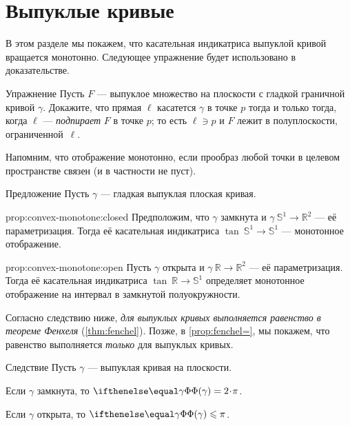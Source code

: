\section{Выпуклые кривые}

В этом разделе мы покажем, что касательная индикатриса выпуклой кривой вращается монотонно.
Следующее упражнение будет использовано в доказательстве.

\begin{thm}{Упражнение}\label{ex:tangent-support}
Пусть $F$ --- выпуклое множество на плоскости с гладкой граничной кривой $\gamma$.
Докажите, что прямая $\ell$ касатется $\gamma$ в точке $p$ тогда и только тогда, когда $\ell$ --- \emph{подпирает} $F$ в точке $p$;
то есть $\ell\ni p$ и $F$ лежит в полуплоскости, ограниченной~$\ell$.
\end{thm}

Напомним, что отображение монотонно, если прообраз любой точки в целевом пространстве связен (и в частности не пуст).

\begin{thm}{Предложение}\label{prop:convex-monotone}
Пусть $\gamma$ --- гладкая выпуклая плоская кривая.

\begin{subthm}{prop:convex-monotone:closed}
Предположим, что $\gamma$ замкнута и $\gamma\:\mathbb{S}^1\to \mathbb{R}^2$ --- её параметризация.
Тогда её касательная индикатриса $\tan\:\mathbb{S}^1\to \mathbb{S}^1$ --- монотонное отображение.
\end{subthm}

\begin{subthm}{prop:convex-monotone:open}
Пусть $\gamma$ открыта и $\gamma\:\mathbb{R}\to \mathbb{R}^2$ --- её параметризация.
Тогда её касательная индикатриса $\tan\:\mathbb{R}\to\mathbb{S}^1$ определяет монотонное отображение на интервал в замкнутой полуокружности.
\end{subthm}

\end{thm}

Согласно следствию ниже, \textit{для выпуклых кривых выполняется равенство в теореме Фенхеля} (\ref{thm:fenchel}).
Позже, в \ref{prop:fenchel=}, мы покажем, что равенство выполняется \textit{только} для выпуклых кривых.

\begin{thm}{Следствие}\label{cor:fenchel=convex}
Пусть $\gamma$ --- выпуклая кривая на плоскости.

\begin{subthm}{}
Если $\gamma$ замкнута, то $\tc\gamma=2\cdot\pi$.
\end{subthm}

\begin{subthm}{}
Если $\gamma$ открыта, то $\tc\gamma\le\pi$.
\end{subthm}

\end{thm}


